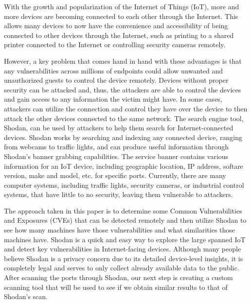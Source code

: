 With the growth and popularization of the Internet of Things (IoT),
more and more devices are becoming connected to each other through the Internet. 
This allows many devices to now have the convenience and accessibility of being 
connected to other devices through the Internet, such as printing to a
shared printer connected to the Internet or controlling security cameras
remotely.

However, a key problem that comes hand in hand with these advantages is that
any vulnerabilities across millions of endpoints could allow unwanted and
unauthorized guests to control the device remotely. Devices without proper
security can be attacked and, thus, the attackers are able to control the 
devices and gain access to any information the victim might have. In some cases,
attackers can utilize the connection and control they have over the device to then 
attack the other devices connected to the same network. The search engine tool, Shodan, can
be used by attackers to help them search for Internet-connected devices. Shodan works by
searching and indexing any connected device, ranging from webcams to traffic lights, and can produce
useful information through Shodan's banner grabbing capabilities. The service banner
contains various information for an IoT device, including geographic location, 
IP address, softare version, make and model, etc. for specific ports. 
Currently, there are many computer systems, including traffic lights, security cameras,
or industrial control systems, that have little to no security, leaving them vulnerable to attackers\cite{afit//CSAR-10-025-01}.

The approach taken in this paper is to determine some Common Vulnerabilities
and Exposures (CVEs) that can be detected remotely and then utilize Shodan
to see how many machines have those vulnerabilities and what similarities
those machines have. Shodan is a quick and easy way to explore the large
spanned IoT and detect key vulnerabilities in Internet-facing devices.
Although many people believe Shodan is a privacy concern due to its detailed
device-level insights, it is completely legal and serves to only collect
already available data to the public. After scanning the ports through Shodan,
our next step is creating a custom scanning tool that will be used to see if we obtain
similar results to that of Shodan's scan. 

